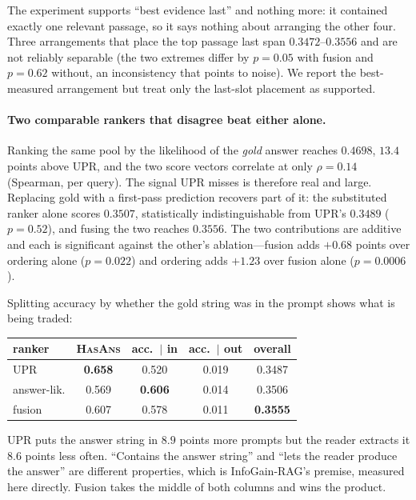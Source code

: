 \documentclass[11pt]{article}
\begin{document}
The experiment supports ``best evidence last'' and nothing more: it contained exactly one
relevant passage, so it says nothing about arranging the other four. Three arrangements that
place the top passage last span $0.3472$--$0.3556$ and are not reliably separable (the two
extremes differ by $p{=}0.05$ with fusion and $p{=}0.62$ without, an inconsistency that points
to noise). We report the best-measured arrangement but treat only the last-slot placement as
supported.

\paragraph{Two comparable rankers that disagree beat either alone.} Ranking the same pool by
the likelihood of the \emph{gold} answer reaches $0.4698$, $13.4$ points above UPR, and the
two score vectors correlate at only $\rho{=}0.14$ (Spearman, per query). The signal UPR misses
is therefore real and large. Replacing gold with a first-pass prediction recovers part of it:
the substituted ranker alone scores $0.3507$, statistically indistinguishable from UPR's
$0.3489$ ($p{=}0.52$), and fusing the two reaches $0.3556$. The two contributions are additive
and each is significant against the other's ablation---fusion adds $+0.68$ points over
ordering alone ($p{=}0.022$) and ordering adds $+1.23$ over fusion alone ($p{=}0.0006$).

Splitting accuracy by whether the gold string was in the prompt shows what is being traded:

\begin{center}\small
\begin{tabular}{@{}lcccc@{}}
\toprule
ranker & \textsc{HasAns} & acc.\ $\mid$ in & acc.\ $\mid$ out & overall \\
\midrule
UPR          & \textbf{0.658} & 0.520 & 0.019 & 0.3487 \\
answer-lik.  & 0.569 & \textbf{0.606} & 0.014 & 0.3506 \\
fusion       & 0.607 & 0.578 & 0.011 & \textbf{0.3555} \\
\bottomrule
\end{tabular}
\end{center}

UPR puts the answer string in $8.9$ points more prompts but the reader extracts it $8.6$
points less often. ``Contains the answer string'' and ``lets the reader produce the answer''
are different properties, which is InfoGain-RAG's premise, measured here directly. Fusion
takes the middle of both columns and wins the product.
\end{document}
